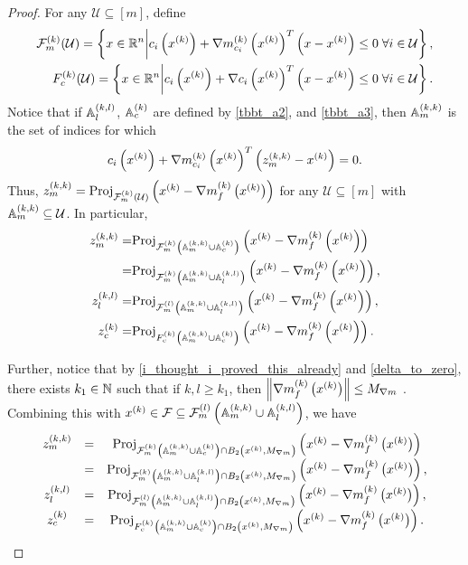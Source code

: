 \begin{proof}

For any $\mathcal U \subseteq [m]$, define
\begin{align*}
\feasiblek(\mathcal U)  = \left\{x \in \Rn \bigg| c_i\left(\xk\right) + \gmcik^T\left(x - \xk\right) \le 0 \; \forall i \in \mathcal U \right\}, \\
\truefeasiblek(\mathcal U)  = \left\{x \in \Rn \bigg| c_i\left(\xk\right) + \nabla c_i\left(\xk\right)^T\left(x - \xk\right) \le 0 \; \forall i \in \mathcal U \right\}.
\end{align*}
Notice that if $\Alk$, $\Ack$
are defined by
\cref{tbbt_a2}, and \cref{tbbt_a3},
then $\Amk$ is the set of indices for which 
\begin{align*}
c_i\left(\xk\right) + \gmcik^T\left(\zmk - \xk\right) = 0.
\end{align*}
Thus, $\zmk = \proj_{\feasiblek(\mathcal U)}\left(\xk - \gk\right)$ for any $\mathcal U \subseteq [m]$ with $\Amk \subseteq \mathcal U$.
In particular,
\begin{align*}
\zmk =& \proj_{\feasiblek\left(\Amk \cup \Ack\right)}\left(\xk - \gk\right) \\
=& \proj_{\feasiblek\left(\Amk \cup \Alk\right)}\left(\xk - \gk\right), \\
\zlk =& \proj_{\feasiblel\left(\Amk \cup \Alk\right)}\left(\xk - \gk\right), \\
\zck =& \proj_{\truefeasiblek\left(\Amk \cup \Ack\right)}\left(\xk - \gk\right).
\end{align*}

Further, notice that by \cref{i_thought_i_proved_this_already} and \cref{delta_to_zero}, there exists $k_1 \in \naturals$ such that if $k, l \ge k_1$, 
then
$\left\|\gk\right\| \le \maxmodelgrad$
.
Combining this with $\xk \in \feasible \subseteq \feasiblel\left(\Amk \cup \Alk\right)$, we have 
\begin{align}
\begin{array}{ccc}
\zmk &=& \proj_{\feasiblek\left(\Amk \cup \Ack\right) \cap B_2\left(\xk, \maxmodelgrad\right)}\left(\xk - \gk\right)  \\
     &=& \proj_{\feasiblek\left(\Amk \cup \Alk\right) \cap B_2\left(\xk, \maxmodelgrad\right)}\left(\xk - \gk\right), \\
\zlk &=& \proj_{\feasiblel\left(\Amk \cup \Alk\right) \cap B_2\left(\xk, \maxmodelgrad\right)}\left(\xk - \gk\right), \\
\zck &=& \proj_{\truefeasiblek\left(\Amk \cup \Ack\right) \cap B_2\left(\xk, \maxmodelgrad\right)}\left(\xk - \gk\right).
\end{array}\label{cbpt_eqn1}
\end{align}


\end{proof}
